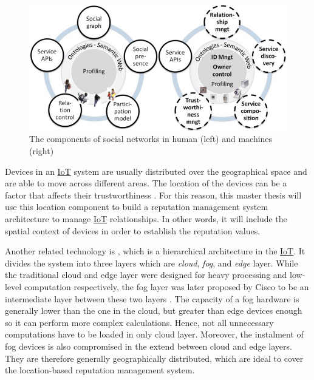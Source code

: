 \begin{figure}[hbt!]
  \centering
  \includegraphics[width=\textwidth]{images/SIoTLuigiA.jpg}
  \caption{The components of social networks in human (left) and machines (right) \citep{SIoTSocialStructure}}
  \label{fig:SIoTLuigiA}
\end{figure}

\npara Devices in an \hyperref[Acronym-IoT]{IoT} system are usually distributed over the geographical space and are able to move across different areas.
The location of the devices can be a factor that affects their trustworthiness \citep{TrustEnhancedSecurityLocationBased}.
For this reason, this master thesis will use this location component to build a reputation management system architecture to manage \hyperref[Acronym-IoT]{IoT} relationships.
In other words, it will include the spatial context of devices in order to establish the reputation values.

\npara Another related technology is , which is a hierarchical architecture in the \hyperref[Acronym-IoT]{IoT}.
It divides the system into three layers which are \textit{cloud}, \textit{fog}, and \textit{edge} layer.
While the traditional cloud and edge layer were designed for heavy processing and low-level computation respectively, the fog layer was later proposed by Cisco to be an intermediate layer between these two layers \citep{CiscoUnleashFog}.
The capacity of a fog hardware is generally lower than the one in the cloud, but greater than edge devices enough so it can perform more complex calculations.
Hence, not all unnecessary computations have to be loaded in only cloud layer.
Moreover, the instalment of fog devices is also compromised in the extend between cloud and edge layers.
They are therefore generally geographically distributed, which are ideal to cover the location-based reputation management system.

